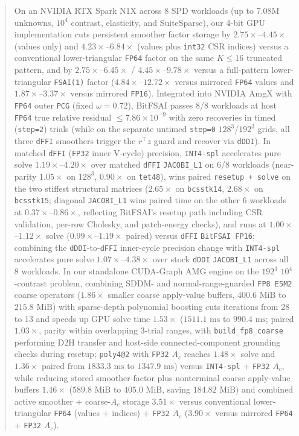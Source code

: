 \documentclass[10pt]{article}
\begin{document}
\begin{abstract}
On an NVIDIA RTX Spark N1X across 8 SPD workloads (up to 7.08M unknowns, $10^4$ contrast, elasticity, and SuiteSparse), our 4-bit GPU implementation cuts persistent smoother factor storage by $2.75\times$--$4.45\times$ (values only) and $4.23\times$--$6.84\times$ (values plus \texttt{int32} CSR indices) versus a conventional lower-triangular \texttt{FP64} factor on the same $K \le 16$ truncated pattern, and by $2.75\times$--$6.45\times$ / $4.45\times$--$9.78\times$ versus a full-pattern lower-triangular \texttt{FSAI(1)} factor ($4.84\times$--$12.72\times$ versus mirrored \texttt{FP64} values and $1.87\times$--$3.37\times$ versus mirrored \texttt{FP16}). Integrated into NVIDIA AmgX with \texttt{FP64} outer \texttt{PCG} (fixed $\omega = 0.72$), BitFSAI passes 8/8 workloads at host \texttt{FP64} true relative residual $\le 7.86\times 10^{-9}$ with zero recoveries in timed (\texttt{step=2}) trials (while on the separate untimed \texttt{step=0} $128^3$/$192^3$ grids, all three \texttt{dFFI} smoothers trigger the $r^\top z$ guard and recover via \texttt{dDDI}). In matched \texttt{dFFI} (\texttt{FP32} inner V-cycle) precision, \texttt{INT4-spl} accelerates pure solve $1.19\times$--$4.20\times$ over matched \texttt{dFFI} \texttt{JACOBI\_L1} on 6/8 workloads (near-parity $1.05\times$ on $128^3$, $0.90\times$ on \texttt{tet48}), wins paired \texttt{resetup + solve} on the two stiffest structural matrices ($2.65\times$ on \texttt{bcsstk14}, $2.68\times$ on \texttt{bcsstk15}; diagonal \texttt{JACOBI\_L1} wins paired time on the other 6 workloads at $0.37\times$--$0.86\times$, reflecting BitFSAI's resetup path including CSR validation, per-row Cholesky, and patch-energy checks), and runs at $1.00\times$--$1.12\times$ solve ($0.99\times$--$1.19\times$ paired) versus \texttt{dFFI} \texttt{BitFSAI FP16}; combining the \texttt{dDDI}-to-\texttt{dFFI} inner-cycle precision change with \texttt{INT4-spl} accelerates pure solve $1.07\times$--$4.38\times$ over stock \texttt{dDDI} \texttt{JACOBI\_L1} across all 8 workloads. In our standalone CUDA-Graph AMG engine on the $192^3$ $10^4$-contrast problem, combining SDDM- and normal-range-guarded \texttt{FP8 E5M2} coarse operators ($1.86\times$ smaller coarse apply-value buffers, $400.6\text{ MiB}$ to $215.8\text{ MiB}$) with sparse-depth polynomial boosting cuts iterations from 28 to 13 and speeds up GPU solve time $1.53\times$ ($1511.1\text{ ms}$ to $990.4\text{ ms}$; paired $1.03\times$, parity within overlapping 3-trial ranges, with \texttt{build\_fp8\_coarse} performing D2H transfer and host-side connected-component grounding checks during resetup; \texttt{poly4@2} with \texttt{FP32} $A_c$ reaches $1.48\times$ solve and $1.36\times$ paired from $1833.3\text{ ms}$ to $1347.9\text{ ms}$) versus \texttt{INT4-spl} + \texttt{FP32} $A_c$, while reducing stored smoother-factor plus nonterminal coarse apply-value buffers $1.46\times$ ($589.8\text{ MiB}$ to $405.0\text{ MiB}$, saving $184.82\text{ MiB}$) and combined active smoother + coarse-$A_c$ storage $3.51\times$ versus conventional lower-triangular \texttt{FP64} (values + indices) + \texttt{FP32} $A_c$ ($3.90\times$ versus mirrored \texttt{FP64} + \texttt{FP32} $A_c$).


\end{abstract}
\end{document}
